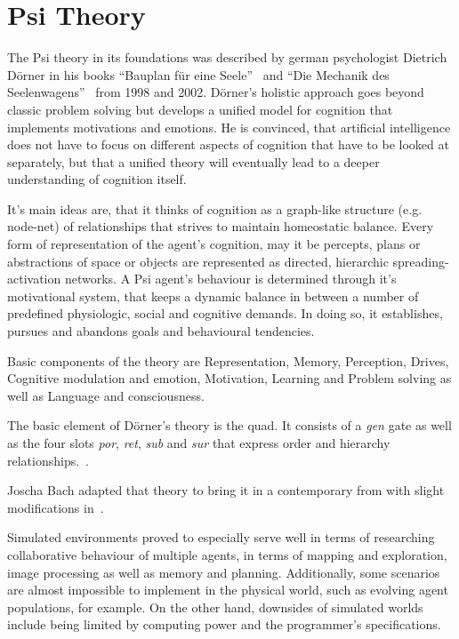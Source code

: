 \section{Psi Theory}
The Psi theory in its foundations was described by german psychologist Dietrich Dörner in his books ``Bauplan für eine Seele''~\cite{Doerner1998} and ``Die Mechanik des Seelenwagens''~\cite{dorner2002mechanik} from 1998 and 2002. Dörner's holistic approach goes beyond classic problem solving but develops a unified model for cognition that implements motivations and emotions. He is convinced, that artificial intelligence does not have to focus on different aspects of cognition that have to be looked at separately, but that a unified theory will eventually lead to a deeper understanding of cognition itself.

It's main ideas are, that it thinks of cognition as a graph-like structure (e.g. node-net) of relationships that strives to maintain homeostatic balance. Every form of representation of the agent's cognition, may it be percepts, plans or abstractions of space or objects are represented as directed, hierarchic spreading-activation networks. A Psi agent's behaviour is determined through it's motivational system, that keeps a dynamic balance in between a number of predefined physiologic, social and cognitive demands. In doing so, it establishes, pursues and abandons goals and behavioural tendencies.\cite{Bach:2009:PSI:1611304}

Basic components of the theory are Representation, Memory, Perception, Drives, Cognitive modulation and emotion, Motivation, Learning and Problem solving as well as Language and consciousness. %

The basic element of Dörner's theory is the quad. It consists of a \emph{gen} gate as well as the four slots \emph{por}, \emph{ret}, \emph{sub} and \emph{sur} that express order and hierarchy relationships.~\cite{Bach:2009:PSI:1611304}.


Joscha Bach adapted that theory to bring it in a contemporary from with slight modifications in~\cite{Bach:2009:PSI:1611304}.

Simulated environments proved to especially serve well in terms of researching collaborative behaviour of multiple agents, in terms of mapping and exploration, image processing as well as memory and planning. Additionally, some scenarios are almost impossible to implement in the physical world, such as evolving agent populations, for example. On the other hand, downsides of simulated worlds include being limited by computing power and the programmer's specifications.~\cite{Bach:2009:PSI:1611304}


